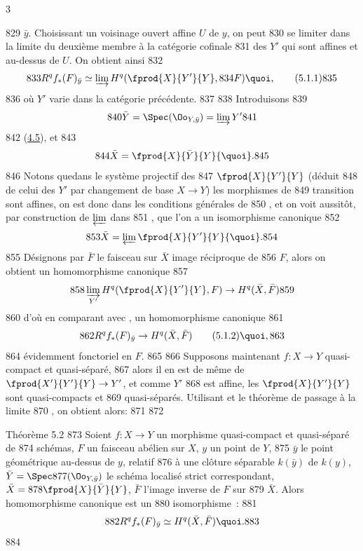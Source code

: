 3	\documentclass[10pt]{../fichiers-configuration-latex/smfart}
\begin{document}
   829	$\bar{y}$. Choisissant un voisinage ouvert affine $U$ de $y$, on peut
   830	se limiter dans la limite du deuxième membre à la catégorie cofinale
   831	des $Y'$ qui sont affines et au-dessus de $U$. On obtient ainsi
   832	\begin{equation*}
   833	R^q f_{\ast} (F)_{\bar{y}} \simeq \varinjlim H^q (\fprod{X}{Y'}{Y},
   834	F){\quoi},\tag{5.1.1}
   835	\end{equation*}
   836	où $Y'$ varie dans la catégorie précédente.
   837	
   838	Introduisons
   839	$$
   840	\bar{Y} = \Spec (\Oo_{Y, \bar{y}}) = \varinjlim Y'
   841	$$
   842	(\cf \hyperref[VIII.subsec4.5]{4.5}), et
   843	$$
   844	\bar{X} = \fprod{X}{\bar{Y}}{Y}{\quoi}.
   845	$$
   846	Notons que\pageoriginale dans le système projectif des
   847	$\fprod{X}{Y'}{Y}$ (déduit
   848	de celui des $Y'$ par changement de base $X \to Y$) les morphismes de
   849	transition sont affines, on est donc dans les conditions générales de
   850	, et on voit aussitôt, par construction de $\varprojlim$ dans
   851	\loccit, que l'on a un isomorphisme canonique
   852	$$
   853	\bar{X} = \varprojlim \fprod{X}{Y'}{Y}{\quoi}.
   854	$$
   855	Désignons par $\bar{F}$ le faisceau sur $\bar{X}$ image réciproque de
   856	$F$, alors on obtient un homomorphisme canonique
   857	$$
   858	\varinjlim_{Y'} H^q (\fprod{X}{Y'}{Y}, F) \to H^q (\bar{X}, \bar{F})
   859	$$
   860	d'où en comparant avec , un homomorphisme canonique
   861	\begin{equation*}
   862	R^q f_{\ast} (F)_{\bar{y}} \to H^q (\bar{X}, \bar{F})\tag{5.1.2}{\quoi},
   863	\end{equation*}
   864	évidemment fonctoriel en $F$.
   865	
   866	Supposons maintenant $f : X \to Y$ quasi-compact et quasi-séparé,
   867	alors il en est de même de $\fprod{X'}{Y'}{Y} \to Y'$, et comme $Y'$
   868	est affine, les $\fprod{X}{Y'}{Y}$ sont quasi-compacts et
   869	quasi-séparés. Utilisant  et le théorème de passage à la limite
   870	, on obtient alors:
   871	
   872	\begin{enonce*}{Théorème 5.2}
   873	Soient $f : X \to Y$ un morphisme quasi-compact et quasi-séparé de
   874	schémas, $F$ un faisceau abélien sur $X$, $y$ un point de $Y$,
   875	$\bar{y}$ le point géométrique au-dessus de $y$, relatif
   876	à une clôture séparable $k(\bar{y})$ de $k(y)$, $\bar{Y} = \Spec
   877	(\Oo_{Y,\bar{y}})$ le schéma localisé strict correspondant, $\bar{X} =
   878	  \fprod{X}{\bar{Y}}{Y}$, $\bar{F}$ l'image inverse de $F$ sur
   879	  $\bar{X}$. Alors homomorphisme canonique  est un
   880	  isomorphisme :
   881	$$
   882	R^q f_{\ast}(F)_{\bar{y}} \simeq H^q (\bar{X}, \bar{F}){\quoi}.
   883	$$
   884	\end{enonce*}
\end{document}
